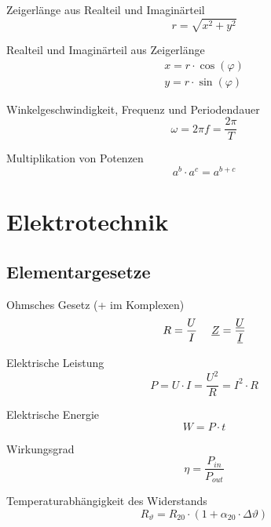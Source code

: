 \documentclass[11pt, a4paper, draft, fleqn, twocolumn]{article}
\numberwithin{equation}{subsection}
\begin{document}
\noindent Zeigerlänge aus Realteil und Imaginärteil
\begin{equation}
    r = \sqrt{x^2 + y^2}
\end{equation}

\noindent Realteil und Imaginärteil aus Zeigerlänge
\begin{equation}
\begin{split}
    x = r \cdot \cos(\varphi) \\
    y = r \cdot \sin(\varphi)
\end{split}
\end{equation}

\noindent Winkelgeschwindigkeit, Frequenz und Periodendauer
\begin{equation}
    \omega = 2\pi f = \frac{2\pi}{T}
\end{equation}

\noindent Multiplikation von Potenzen
\begin{equation}
    a^b \cdot a^c = a^{b+c}
\end{equation}



\section{Elektrotechnik}

\subsection{Elementargesetze}

Ohmsches Gesetz (+ im Komplexen)
\begin{equation}
    R = \frac{U}{I} \hspace{3ex}
    \underline{Z} = \frac{\underline{U}}{\underline{I}}
\end{equation}

\noindent Elektrische Leistung
\begin{equation}
    P = U \cdot I = \frac{U^2}{R} = I^2 \cdot R
\end{equation}

\noindent Elektrische Energie
\begin{equation}
    W = P \cdot t
\end{equation}

\noindent Wirkungsgrad
\begin{equation}
    \eta = \frac{P_{in}}{P_{out}}
\end{equation}

\noindent Temperaturabhängigkeit des Widerstands
\begin{equation}
    R_\vartheta = R_{20}\cdot(1 + \alpha_{20} \cdot \Delta \vartheta)
\end{equation}
\end{document}
